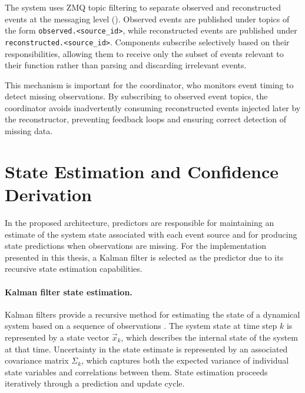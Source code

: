 The system uses ZMQ topic filtering to separate observed and reconstructed events at the messaging level (). Observed events are published under topics of the form \texttt{observed.<source\_id>}, while reconstructed events are published under \texttt{reconstructed.<source\_id>}. Components subscribe selectively based on their responsibilities, allowing them to receive only the subset of events relevant to their function rather than parsing and discarding irrelevant events.



This mechanism is important for the coordinator, who monitors event timing to detect missing observations. By subscribing to observed event topics, the coordinator avoids inadvertently consuming reconstructed events injected later by the reconstructor, preventing feedback loops and ensuring correct detection of missing data.



\section{State Estimation and Confidence Derivation}
\label{sec:predictor-confidence}
In the proposed architecture, predictors are responsible for maintaining an estimate of the system state associated with each event source and for producing state predictions when observations are missing. For the implementation presented in this thesis, a Kalman filter is selected as the predictor due to its recursive state estimation capabilities.

\paragraph{Kalman filter state estimation.}
Kalman filters provide a recursive method for estimating the state of a dynamical system based on a sequence of observations \cite{kalman1960filtering,bishop2001introduction}. The system state at time step $k$ is represented by a state vector $\vec{x}_k$, which describes the internal state of the system at that time. Uncertainty in the state estimate is represented by an associated covariance matrix $\Sigma_k$, which captures both the expected variance of individual state variables and correlations between them. State estimation proceeds iteratively through a prediction and update cycle.


